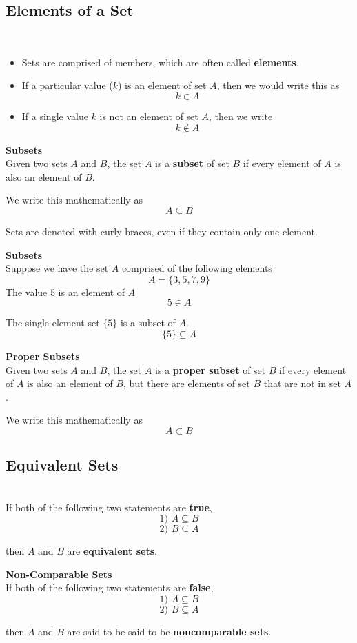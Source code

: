 
\subsection{Elements of a Set}\\
\begin{itemize}
\item Sets are comprised of members, which are often called \textbf{elements}. 
\item If a particular value ($k$) is an element of set $A$, then we would write this as
\[k \in A \]

\item If a single value $k$ is not an element of set $A$, then we write
\[k \notin A \]
\end{itemize}

\textbf{Subsets}\\
Given two sets $A$ and $B$, the set $A$ is a \textbf{subset} of set $B$ if every element of $A$ is also an element of $B$. 


We write this mathematically as
\[A \subseteq B \]


\bigskip
Sets are denoted with curly braces, even if they contain only one element.


\textbf{Subsets}\\
Suppose we have the set $A$ comprised of the following elements
\[ A =\{3,5,7,9\}\]
The value $5$ is an element of $A$
\[  5 \in A \]

The single element set $\{5\} $ is a subset of $A$.
\[ \{5\} \subseteq A\]


\textbf{Proper Subsets}\\
Given two sets $A$ and $B$, the set $A$ is a \textbf{proper subset} of set $B$ if every element of $A$ is also an element of $B$, but there are elements of set $B$ that are not in set $A$.


We write this mathematically as
\[A \subset B \]


\subsection{Equivalent Sets}\\
If both of the following two statements are \textbf{true}, 
\[\mbox{1)  } A \subseteq B \]
\[\mbox{2)  } B \subseteq A \]

then $A$ and $B$ are \textbf{equivalent sets}.



\textbf{Non-Comparable Sets}\\
If both of the following two statements are \textbf{false}, 
\[\mbox{1)  } A \subseteq B \]
\[\mbox{2)  } B \subseteq A \]

then $A$ and $B$ are said to be said to be \textbf{noncomparable sets}.




